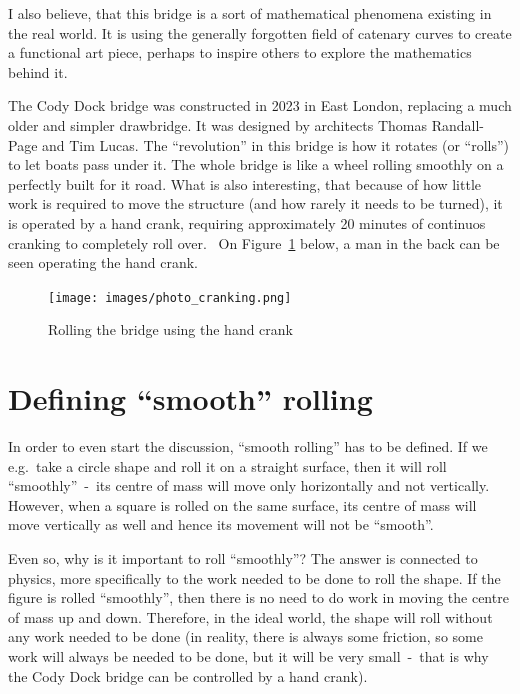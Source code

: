 \documentclass[12pt]{article}
\begin{document}
        I also believe, that this bridge is a sort of mathematical phenomena existing in the real world. It is using the generally forgotten field of catenary curves to create a functional art piece, perhaps to inspire others to explore the mathematics behind it.

        The Cody Dock bridge was constructed in 2023 in East London, replacing a much older and simpler drawbridge. It was designed by architects Thomas Randall-Page and Tim Lucas. The ``revolution'' in this bridge is how it rotates (or ``rolls'') to let boats pass under it. The whole bridge is like a wheel rolling smoothly on a perfectly built for it road. What is also interesting, that because of how little work is required to move the structure (and how rarely it needs to be turned), it is operated by a hand crank, requiring approximately 20 minutes of continuos cranking to completely roll over.~\cite{bridge_newatlas,parker.2023} On Figure~\ref{fig:photo_cranking} below, a man in the back can be seen operating the hand crank.

        \begin{figure}[H]
            \centering
            \texttt{[image: images/photo\_cranking.png]}
            \caption[Rolling the bridge using the hand crank]{Rolling the bridge using the hand crank\footnotemark}\label{fig:photo_cranking}
        \end{figure}

    \section{Defining ``smooth'' rolling}

        In order to even start the discussion, ``smooth rolling'' has to be defined. If we e.g.\ take a circle shape and roll it on a straight surface, then it will roll ``smoothly''~-~its centre of mass will move only horizontally and not vertically. However, when a square is rolled on the same surface, its centre of mass will move vertically as well and hence its movement will not be ``smooth''.~\cite{morphocular.2022,Hall_Wagon_1992}

        Even so, why is it important to roll ``smoothly''? The answer is connected to physics, more specifically to the work needed to be done to roll the shape. If the figure is rolled ``smoothly'', then there is no need to do work in moving the centre of mass up and down. Therefore, in the ideal world, the shape will roll without any work needed to be done (in reality, there is always some friction, so some work will always be needed to be done, but it will be very small~-~that is why the Cody Dock bridge can be controlled by a hand crank).
\end{document}
